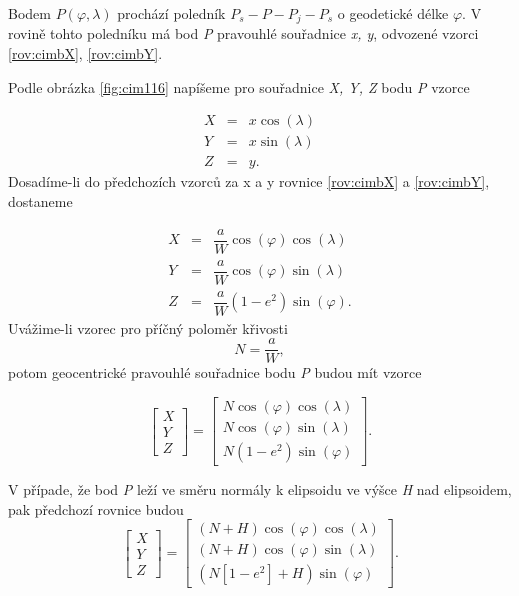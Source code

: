 \documentclass[11pt,a4paper]{article}
\begin{document}
Bodem $P\left(\varphi, \lambda\right)$ prochází poledník $P_{s}-P-P_{j}-P_{s}$ o geodetické délke $\varphi$. V rovině tohto poledníku má bod \textit{P} pravouhlé souřadnice \textit{x, y}, odvozené vzorci \ref{rov:cimbX}, \ref{rov:cimbY}.

Podle obrázka \ref{fig:cim116} napíšeme pro souřadnice \textit{X, Y, Z} bodu \textit{P} vzorce

\begin{eqnarray}
X &=& x\cos{\left(\lambda\right)} \\
Y &=& x\sin{\left(\lambda\right)} \\
Z &=& y. 
\end{eqnarray}
Dosadíme-li do předchozích vzorců za x a y rovnice \ref{rov:cimbX} a \ref{rov:cimbY}, dostaneme

\begin{eqnarray}
X &=& \dfrac{a}{W}\cos{\left(\varphi\right)}\cos{\left(\lambda\right)} \\
Y &=& \dfrac{a}{W}\cos{\left(\varphi\right)}\sin{\left(\lambda\right)} \\
Z &=& \dfrac{a}{W}\left(1-e^{2}\right)\sin{\left(\varphi\right)}.
\end{eqnarray}
Uvážime-li vzorec pro příčný poloměr křivosti 
\begin{equation}
N = \dfrac{a}{W},
\end{equation}
potom geocentrické pravouhlé souřadnice bodu \textit{P} budou mít vzorce

\begin{equation}
\begin{bmatrix}
X\\
Y\\
Z
\end{bmatrix} = 
\begin{bmatrix}
N\cos{\left(\varphi\right)}\cos{\left(\lambda\right)}\\
N\cos{\left(\varphi\right)}\sin{\left(\lambda\right)}\\
N\left(1-e^{2}\right)\sin{\left(\varphi\right)}
\end{bmatrix}.
\end{equation}

V případe, že bod \textit{P} leží ve směru normály k elipsoidu ve výšce \textit{H} nad elipsoidem, pak předchozí rovnice budou
\begin{equation}
\begin{bmatrix}
X\\
Y\\
Z
\end{bmatrix} = 
\begin{bmatrix}
\left(N+H\right)\cos{\left(\varphi\right)}\cos{\left(\lambda\right)}\\
\left(N+H\right)\cos{\left(\varphi\right)}\sin{\left(\lambda\right)}\\
\left(N\left[1-e^{2}\right]+H\right)\sin{\left(\varphi\right)}
\end{bmatrix}.
\label{rov:geodEcef}
\end{equation}
\end{document}
